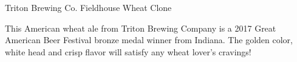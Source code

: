\begin{recipe}{Triton Brewing Co. Fieldhouse Wheat Clone}

\begin{aboutblock}
This American wheat ale from Triton Brewing Company is a 2017 Great American
Beer Festival bronze medal winner from Indiana. The golden color, white head
and crisp flavor will satisfy any wheat lover's cravings! \sourceaha
\end{aboutblock}


\begin{methodandtiming}
 
\begin{mashsteps}
\end{mashsteps}

\begin{fermentationsteps}
\end{fermentationsteps}

\end{methodandtiming}

\recipebreak

\begin{ingredientsblock}

\begin{malts}
\end{malts}

\begin{hops}
\end{hops}


\end{ingredientsblock}

\end{recipe}

